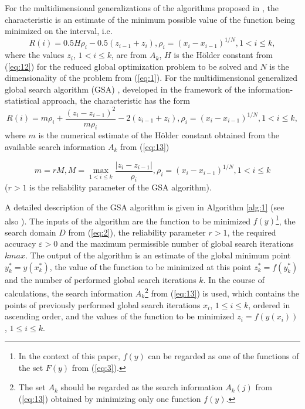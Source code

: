 \documentclass[review]{elsarticle}
\begin{document}
For the multidimensional generalizations of the algorithms proposed in \cite{c34,c35}, the characteristic is an estimate of the minimum possible value of the function being minimized on the interval, i.e.
\begin{equation}\label{eq:17}
R(i)=0.5 H \rho_i - 0.5 (z_{i-1} + z_i), \rho_i=(x_i - x_{i-1})^{1/N}, 1 < i \leq k,
\end{equation}
where the values $z_i$, $1<i \leq k$, are from $A_k$, $H$ is the H\"older constant from (\ref{eq:12}) for the reduced global optimization problem to be solved and $N$ is the dimensionality of the problem from (\ref{eq:1}). For the multidimensional generalized global search algorithm (GSA) \cite{c6,c23}, developed in the framework of the information-statistical approach, the characteristic has the form
\begin{equation}\label{eq:18}
R(i)=m \rho_i+\frac{(z_i-z_{i-1})^2}{m \rho_i }-2(z_{i-1}+z_i ), \rho_i=(x_i-x_{i-1})^{1/N}  ,1 < i \leq k,
\end{equation}
where $m$ is the numerical estimate of the H\"older constant obtained from the available search information $A_k$ from (\ref{eq:13})

\begin{equation}\label{eq:19}
m=r M, M=\max_{1 < i \leq k} \frac{|z_i-z_{i-1}|}{\rho_i}, \rho_i=(x_i-x_{i-1})^{1/N}  ,1 < i \leq k
\end{equation}
($r>1$ is the reliability parameter of the GSA algorithm).

A detailed description of the GSA algorithm is given in Algorithm \ref{alg:1} (see also \cite{c6}). The inputs of the algorithm are the function to be minimized $f(y)$\footnote{In the context of this paper, $f(y)$ can be regarded as one of the functions of the set $F(y)$ from (\ref{eq:3}).}, the search domain $D$ from (\ref{eq:2}), the reliability parameter $r > 1$, the required accuracy $\varepsilon > 0$ and the maximum permissible number of global search iterations $kmax$. The output of the algorithm is an estimate of the global minimum point $y_k^* =y(x_k^*)$, the value of the function to be minimized at this point $z_k^* =f(y_k^*)$  and the number of performed global search iterations $k$. In the course of calculations, the search information $A_k$\footnote{The set $A_k$ should be regarded as the search information $A_k(j)$ from (\ref{eq:13}) obtained by minimizing only one function $f(y)$.} from (\ref{eq:13}) is used, which contains the points of previously performed global search iterations $x_i$, $1 \leq i \leq k$, ordered in ascending order, and the values of the function to be minimized $z_i=f(y(x_i))$, $1\leq i \leq k$.
\end{document}
